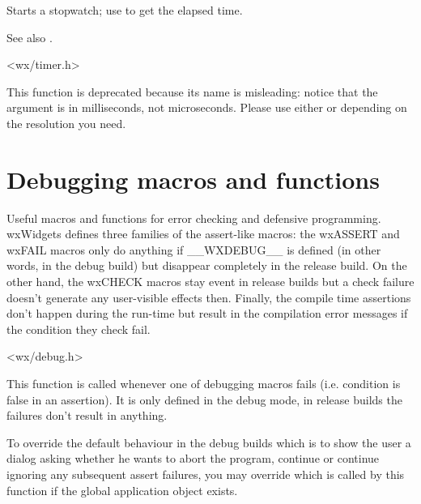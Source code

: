 
Starts a stopwatch; use  to get the elapsed time.

See also .


<wx/timer.h>


\label{wxusleep}


This function is deprecated because its name is misleading: notice that the
argument is in milliseconds, not microseconds. Please use either 
 or  
depending on the resolution you need.



\section{Debugging macros and functions}\label{debugmacros}

Useful macros and functions for error checking and defensive programming.
wxWidgets defines three families of the assert-like macros:
the wxASSERT and wxFAIL macros only do anything if \_\_WXDEBUG\_\_ is defined
(in other words, in the debug build) but disappear completely in the release
build. On the other hand, the wxCHECK macros stay event in release builds but a
check failure doesn't generate any user-visible effects then. Finally, the
compile time assertions don't happen during the run-time but result in the
compilation error messages if the condition they check fail.


<wx/debug.h>


\label{wxonassert}


This function is called whenever one of debugging macros fails (i.e. condition
is false in an assertion). It is only defined in the debug mode, in release
builds the  failures don't result in anything.

To override the default behaviour in the debug builds which is to show the user
a dialog asking whether he wants to abort the program, continue or continue
ignoring any subsequent assert failures, you may override
 which is called by this function if
the global application object exists.



